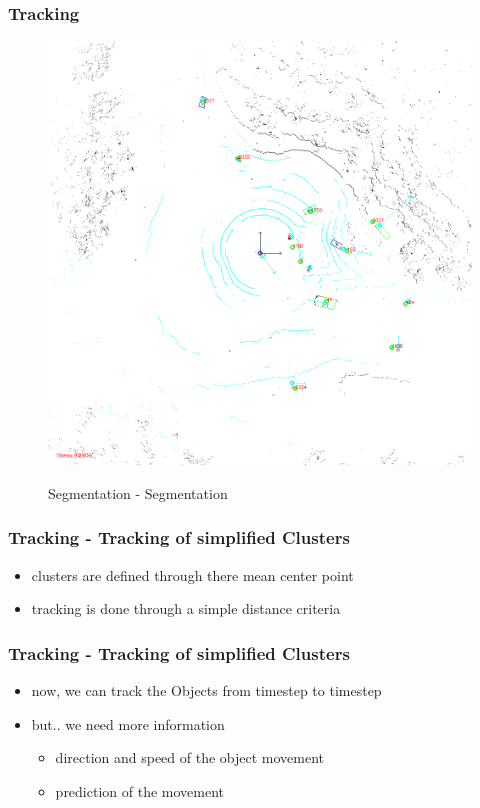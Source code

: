 \documentclass[nosymbols]{beamer}	%
\begin{document}
\begin{frame}
\frametitle{Tracking}
\begin{figure}[!ht]
\caption{Segmentation - Segmentation}
\includegraphics[width=\textwidth,height=0.7\textheight,keepaspectratio]{bilder/clust/img100084.png}
\label{segments}
\end{figure}
\end{frame}

\begin{frame}
\frametitle{Tracking - Tracking of simplified Clusters}
  \begin{itemize}
    \item clusters are defined through there mean center point
    \item tracking is done through a simple distance criteria    
  \end{itemize}
\end{frame}

\begin{frame}
\frametitle{Tracking - Tracking of simplified Clusters}
  \begin{itemize}
    \item now, we can track the Objects from timestep to timestep
    \item but.. we need more information
    \begin{itemize}
    \item direction and speed of the object movement
    \item prediction of the movement
    \end{itemize}
  \end{itemize}
\end{frame}
\end{document}
